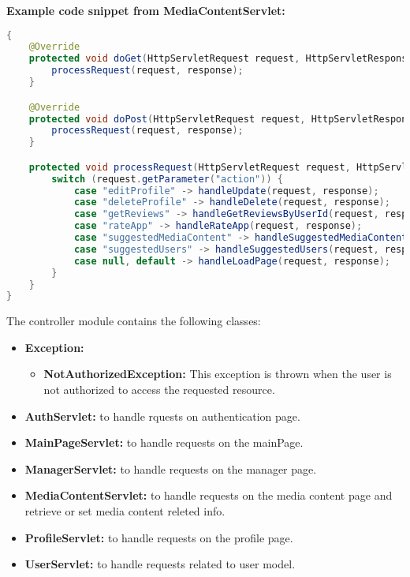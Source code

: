 \vspace{\baselineskip}

\textbf{Example code snippet from MediaContentServlet:}
\begin{mdframed}[backgroundcolor=yellow!20, innerleftmargin=10pt, innerrightmargin=10pt]
    \begin{lstlisting}[language=java]
{
    @Override
    protected void doGet(HttpServletRequest request, HttpServletResponse response) throws IOException, ServletException {
        processRequest(request, response);
    }

    @Override
    protected void doPost(HttpServletRequest request, HttpServletResponse response) throws IOException, ServletException {
        processRequest(request, response);
    }

    protected void processRequest(HttpServletRequest request, HttpServletResponse response) throws IOException, ServletException {
        switch (request.getParameter("action")) {
            case "editProfile" -> handleUpdate(request, response);
            case "deleteProfile" -> handleDelete(request, response);
            case "getReviews" -> handleGetReviewsByUserId(request, response);
            case "rateApp" -> handleRateApp(request, response);
            case "suggestedMediaContent" -> handleSuggestedMediaContent(request, response);
            case "suggestedUsers" -> handleSuggestedUsers(request, response);
            case null, default -> handleLoadPage(request, response);
        }
    }
}
    \end{lstlisting}
\end{mdframed}

The controller module contains the following classes:

\begin{itemize}
    \item \textbf{Exception:}
    \begin{itemize}
        \item \textbf{NotAuthorizedException:} This exception is thrown when the user is not authorized to access the requested resource.
    \end{itemize}
    \item \textbf{AuthServlet:} to handle rquests on authentication page.
    \item \textbf{MainPageServlet:} to handle requests on the mainPage.
    \item \textbf{ManagerServlet:} to handle requests on the manager page.
    \item \textbf{MediaContentServlet:} to handle requests on the media content page and retrieve or set media content releted info.
    \item \textbf{ProfileServlet:} to handle requests on the profile page.
    \item \textbf{UserServlet:} to handle requests related to user model.
\end{itemize}

